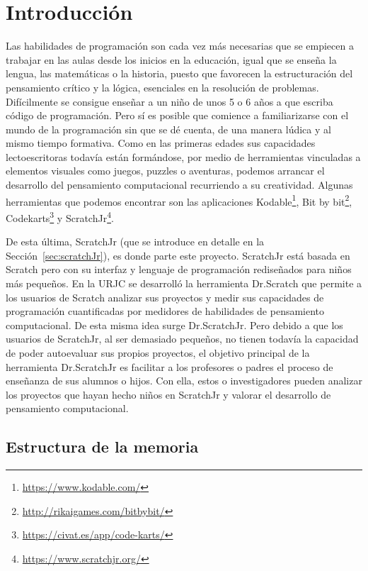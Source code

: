 \documentclass[a4paper, 12pt]{book}
\begin{document}
\cleardoublepage
\chapter{Introducción}
\label{chap:intro} %

Las habilidades de programación son cada vez  más necesarias que se empiecen a trabajar en las aulas desde los inicios en la educación, igual que se enseña la lengua, las matemáticas o la historia, puesto que favorecen la estructuración del pensamiento crítico y la lógica, esenciales en la resolución de problemas.
Difícilmente se consigue enseñar a un niño de unos 5 o 6 años a que escriba código de programación.
Pero sí es posible que comience a familiarizarse con el mundo de la programación sin que se dé cuenta, de una manera lúdica y al mismo tiempo formativa.
Como en las primeras edades sus capacidades lectoescritoras todavía están formándose, por medio de herramientas vinculadas a elementos visuales como juegos, puzzles o aventuras, podemos arrancar el desarrollo del pensamiento computacional recurriendo a su creatividad. Algunas herramientas que podemos encontrar son las aplicaciones Kodable\footnote{\url{https://www.kodable.com/}}, Bit by bit\footnote{\url{http://rikaigames.com/bitbybit/}}, Codekarts\footnote{\url{https://civat.es/app/code-karts/}} y ScratchJr\footnote{\url{https://www.scratchjr.org/}}. 

De esta última, ScratchJr (que se introduce en detalle en la Sección~\ref{sec:scratchJr}), es donde parte este proyecto.
ScratchJr está basada en Scratch pero con su interfaz y lenguaje de programación rediseñados para niños más pequeños.
En la URJC se desarrolló la herramienta Dr.Scratch que permite a los usuarios de Scratch analizar sus proyectos y medir sus capacidades de programación cuantificadas por medidores de habilidades de pensamiento computacional.
De esta misma idea surge Dr.ScratchJr.
Pero debido a que los usuarios de ScratchJr, al ser demasiado pequeños, no tienen todavía la capacidad de poder autoevaluar sus propios proyectos, el objetivo principal de la herramienta Dr.ScratchJr es facilitar a los profesores o padres el proceso de enseñanza de sus alumnos o hijos. 
Con ella, estos o investigadores pueden analizar los proyectos que hayan hecho niños en ScratchJr y valorar el desarrollo de pensamiento computacional.

\section{Estructura de la memoria}
\label{sec:estructura}
\end{document}
